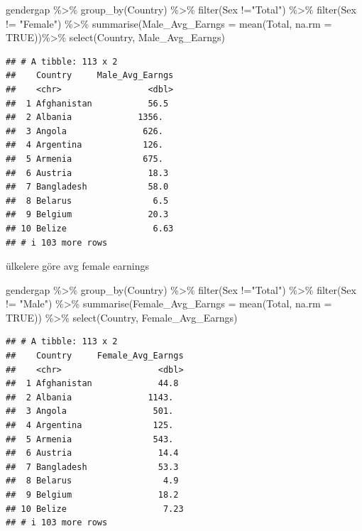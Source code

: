 \documentclass[
]{article}
\newenvironment{Shaded}{\begin{snugshade}}{\end{snugshade}}
\newcommand{\AttributeTok}[1]{\textcolor[rgb]{0.77,0.63,0.00}{#1}}
\newcommand{\ConstantTok}[1]{\textcolor[rgb]{0.00,0.00,0.00}{#1}}
\newcommand{\FunctionTok}[1]{\textcolor[rgb]{0.00,0.00,0.00}{#1}}
\newcommand{\NormalTok}[1]{#1}
\newcommand{\SpecialCharTok}[1]{\textcolor[rgb]{0.00,0.00,0.00}{#1}}
\newcommand{\StringTok}[1]{\textcolor[rgb]{0.31,0.60,0.02}{#1}}
\begin{document}
\begin{Shaded}
\begin{Highlighting}[]
\NormalTok{gendergap }\SpecialCharTok{\%\textgreater{}\%}
  \FunctionTok{group\_by}\NormalTok{(Country) }\SpecialCharTok{\%\textgreater{}\%}
  \FunctionTok{filter}\NormalTok{(Sex }\SpecialCharTok{!=}\StringTok{"Total"}\NormalTok{) }\SpecialCharTok{\%\textgreater{}\%}
  \FunctionTok{filter}\NormalTok{(Sex }\SpecialCharTok{!=} \StringTok{"Female"}\NormalTok{) }\SpecialCharTok{\%\textgreater{}\%}
  \FunctionTok{summarise}\NormalTok{(}\AttributeTok{Male\_Avg\_Earngs =} \FunctionTok{mean}\NormalTok{(Total, }\AttributeTok{na.rm =} \ConstantTok{TRUE}\NormalTok{))}\SpecialCharTok{\%\textgreater{}\%}
  \FunctionTok{select}\NormalTok{(Country, Male\_Avg\_Earngs)}
\end{Highlighting}
\end{Shaded}

\begin{verbatim}
## # A tibble: 113 x 2
##    Country     Male_Avg_Earngs
##    <chr>                 <dbl>
##  1 Afghanistan           56.5 
##  2 Albania             1356.  
##  3 Angola               626.  
##  4 Argentina            126.  
##  5 Armenia              675.  
##  6 Austria               18.3 
##  7 Bangladesh            58.0 
##  8 Belarus                6.5 
##  9 Belgium               20.3 
## 10 Belize                 6.63
## # i 103 more rows
\end{verbatim}

ülkelere göre avg female earnings

\begin{Shaded}
\begin{Highlighting}[]
\NormalTok{gendergap }\SpecialCharTok{\%\textgreater{}\%}
  \FunctionTok{group\_by}\NormalTok{(Country) }\SpecialCharTok{\%\textgreater{}\%}
  \FunctionTok{filter}\NormalTok{(Sex }\SpecialCharTok{!=}\StringTok{"Total"}\NormalTok{) }\SpecialCharTok{\%\textgreater{}\%}
  \FunctionTok{filter}\NormalTok{(Sex }\SpecialCharTok{!=} \StringTok{"Male"}\NormalTok{) }\SpecialCharTok{\%\textgreater{}\%}
  \FunctionTok{summarise}\NormalTok{(}\AttributeTok{Female\_Avg\_Earngs =} \FunctionTok{mean}\NormalTok{(Total, }\AttributeTok{na.rm =} \ConstantTok{TRUE}\NormalTok{)) }\SpecialCharTok{\%\textgreater{}\%}
  \FunctionTok{select}\NormalTok{(Country, Female\_Avg\_Earngs) }
\end{Highlighting}
\end{Shaded}

\begin{verbatim}
## # A tibble: 113 x 2
##    Country     Female_Avg_Earngs
##    <chr>                   <dbl>
##  1 Afghanistan             44.8 
##  2 Albania               1143.  
##  3 Angola                 501.  
##  4 Argentina              125.  
##  5 Armenia                543.  
##  6 Austria                 14.4 
##  7 Bangladesh              53.3 
##  8 Belarus                  4.9 
##  9 Belgium                 18.2 
## 10 Belize                   7.23
## # i 103 more rows
\end{verbatim}
\end{document}
